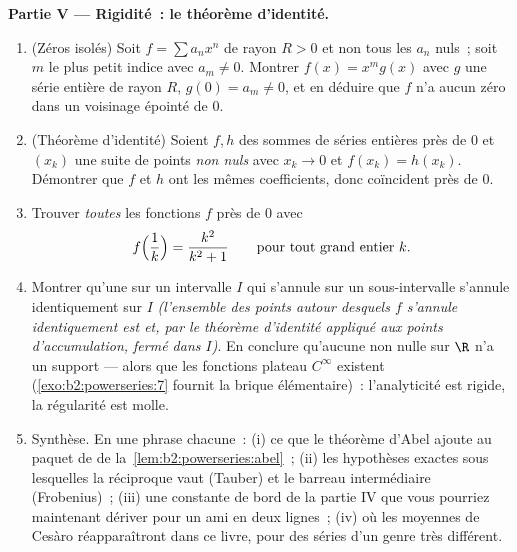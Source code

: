 \begin{problem}
\medskip
\noindent\textbf{Partie V --- Rigidité~: le théorème d'identité.}
\begin{enumerate}[resume]
  \item (Zéros isolés) Soit $f = \sum a_nx^n$ de rayon $R >
        0$ et non tous les $a_n$ nuls~; soit $m$ le plus petit indice
        avec $a_m \neq 0$. Montrer $f(x) = x^m g(x)$ avec $g$ une
        série entière de rayon $R$, $g(0) = a_m \neq 0$, et
        en déduire que $f$ n'a aucun zéro dans un voisinage
        épointé de $0$.
  \item (Théorème d'identité) Soient $f, h$ des sommes de séries entières
        près de $0$ et $(x_k)$ une suite de points \emph{non nuls}
        avec $x_k \to 0$ et $f(x_k) = h(x_k)$. Démontrer
        que $f$ et $h$ ont les mêmes coefficients, donc
        coïncident près de $0$.
  \item Trouver \emph{toutes} les fonctions $f$  près de $0$ avec
        \[
        f\Bigl(\frac1k\Bigr) = \frac{k^2}{k^2+1}
        \qquad\text{pour tout grand entier } k .
        \]
  \item Montrer qu'une  sur un intervalle  $I$
        qui s'annule sur un sous-intervalle s'annule identiquement sur
        $I$ \emph{(l'ensemble des points autour desquels $f$ s'annule
        identiquement est  et, par le théorème d'identité
        appliqué aux points d'accumulation, fermé dans $I$)}.
        En conclure qu'aucune  non nulle sur $\R$ n'a
        un support  --- alors que les fonctions plateau $C^\infty$
        existent (\cref{exo:b2:powerseries:7} fournit la
        brique élémentaire)~: l'analyticité est rigide, la régularité
        est molle.
  \item Synthèse. En une phrase chacune~: (i) ce que le théorème d'Abel
        ajoute au paquet de  de
        la~\cref{lem:b2:powerseries:abel}~; (ii) les hypothèses
        exactes sous lesquelles la réciproque vaut (Tauber) et
        le barreau intermédiaire (Frobenius)~; (iii) une constante de bord
        de la partie IV que vous pourriez maintenant dériver pour un
        ami en deux lignes~; (iv) où les moyennes de Cesàro
        réapparaîtront dans ce livre, pour des séries d'un genre
        très différent.
\end{enumerate}
\end{problem}
